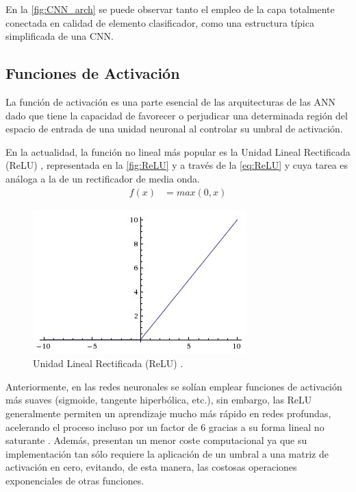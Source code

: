 En la \autoref{fig:CNN_arch} se puede observar tanto el empleo de la capa totalmente conectada en calidad de elemento clasificador, como una estructura típica simplificada de una CNN.

\subsection{Funciones de Activación}

La función de activación es una parte esencial de las arquitecturas de las ANN dado que tiene la capacidad de favorecer o perjudicar una determinada región del espacio de entrada de una unidad neuronal al controlar su umbral de activación.

En la actualidad, la función no lineal más popular es la Unidad Lineal Rectificada (ReLU) \cite{DeepLearning}, representada en la \autoref{fig:ReLU} y a través de la \autoref{eq:ReLU} y cuya tarea es análoga a la de un rectificador de media onda.
\begin{align} \label{eq:ReLU}
    f(x) &= max(0, x) 
\end{align}
\begin{figure}
    \centering
    \includegraphics[scale=0.6]{Images/ReLU.png}
    \caption{Unidad Lineal Rectificada (ReLU) \cite{img:ReLU}.}
    \label{fig:ReLU}
\end{figure}

Anteriormente, en las redes neuronales se solían emplear funciones de activación más suaves (sigmoide, tangente hiperbólica, etc.), sin embargo, las ReLU generalmente permiten un aprendizaje mucho más rápido en redes profundas, acelerando el proceso incluso por un factor de 6 gracias a su forma lineal no saturante \cite{Krizhevsky}. Además, presentan un menor coste computacional ya que su implementación tan sólo requiere la aplicación de un umbral a una matriz de activación en cero, evitando, de esta manera, las costosas operaciones exponenciales de otras funciones.


